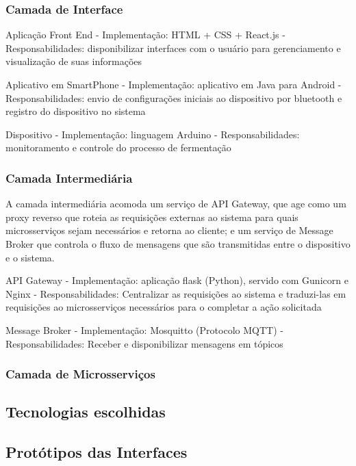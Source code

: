 \subsubsection*{Camada de Interface}

Aplicação Front End
    - Implementação: HTML + CSS + React.js
    - Responsabilidades: disponibilizar interfaces com o usuário para gerenciamento e visualização de suas informações

Aplicativo em SmartPhone
    - Implementação: aplicativo em Java para Android
    - Responsabilidades: envio de configurações iniciais ao dispositivo por bluetooth e registro do dispositivo no sistema

Dispositivo
    - Implementação: linguagem Arduino
    - Responsabilidades: monitoramento e controle do processo de fermentação

\subsubsection*{Camada Intermediária}

    A camada intermediária acomoda um serviço de API Gateway, que age como um proxy reverso que roteia as requisições externas ao sistema para quais microsserviços sejam necessários e retorna ao cliente; e um serviço de Message Broker que controla o fluxo de mensagens que são transmitidas entre o dispositivo e o sistema.
    
    API Gateway
        - Implementação: aplicação flask (Python), servido com Gunicorn e Nginx
        - Responsabilidades: Centralizar as requisições ao sistema e traduzi-las em requisições ao microsserviços necessários para o completar a ação solicitada
    
    Message Broker
        - Implementação: Mosquitto (Protocolo MQTT)
        - Responsabilidades: Receber e disponibilizar mensagens em tópicos
    
\subsubsection*{Camada de Microsserviços}
    
\subsection{Tecnologias escolhidas}

\subsection{Protótipos das Interfaces}

